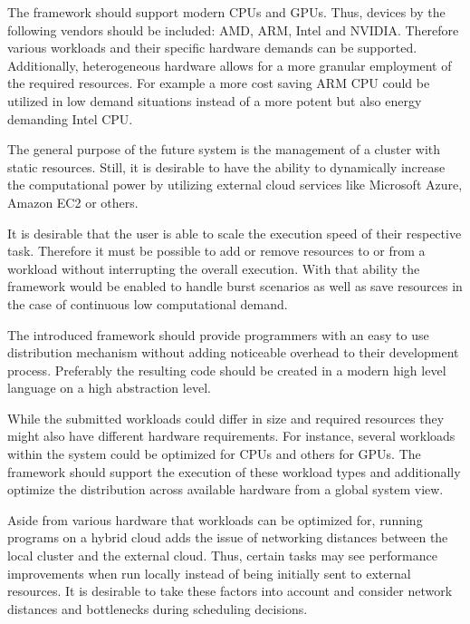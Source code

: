 \begin{description}[style=nextline]
    \item [Heterogeneity]
    The framework should support modern CPUs and GPUs. Thus, devices by the following vendors should be included: AMD, ARM, Intel and NVIDIA. Therefore various workloads and their specific hardware demands can be supported. Additionally, heterogeneous hardware allows for a more granular employment of the required resources. For example a more cost saving ARM CPU could be utilized in low demand situations instead of a more potent but also energy demanding Intel CPU.

    \item [Resource Scalability]
    The general purpose of the future system is the management of a cluster with static resources. Still, it is desirable to have the ability to dynamically increase the computational power by utilizing external cloud services like Microsoft Azure, Amazon EC2 or others.

    \item [Scalable Speed]
    It is desirable that the user is able to scale the execution speed of their respective task. Therefore it must be possible to add or remove resources to or from a workload without interrupting the overall execution. With that ability the framework would be enabled to handle burst scenarios as well as save resources in the case of continuous low computational demand.

    \item [Ease of Programming]
    The introduced framework should provide programmers with an easy to use distribution mechanism without adding noticeable overhead to their development process. Preferably the resulting code should be created in a modern high level language on a high abstraction level.

    \item [Workload Diversity]
    While the submitted workloads could differ in size and required resources they might also have different hardware requirements. For instance, several workloads within the system could be optimized for CPUs and others for GPUs. The framework should support the execution of these workload types and additionally optimize the distribution across available hardware from a global system view.

    \item [Optimized Scheduling]
    Aside from various hardware that workloads can be optimized for, running programs on a hybrid cloud adds the issue of networking distances between the local cluster and the external cloud. Thus, certain tasks may see performance improvements when run locally instead of being initially sent to external resources. It is desirable to take these factors into account and consider network distances and bottlenecks during scheduling decisions.

\end{description}
